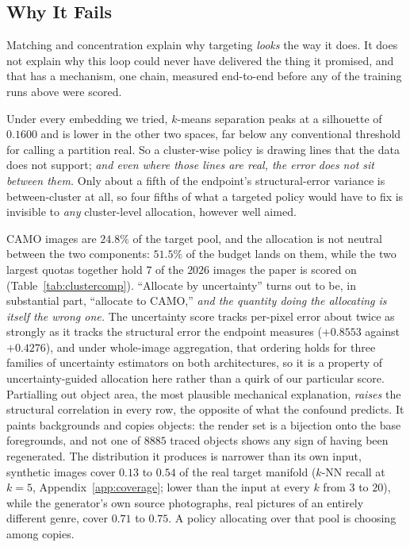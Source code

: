 \documentclass{article}
\newif\ifrevmarked \revmarkedtrue
\DeclareRobustCommand{\revB}[1]{\ifrevmarked{\color{RevB}#1}\else{#1}\fi}
\begin{document}
\subsection{Why It Fails}
\label{sec:why}
\revB{Matching and concentration explain} why targeting \emph{looks} the way it does. It does not explain why this loop
could never have delivered the thing it promised, and that has a mechanism, one chain, measured end-to-end before any of the training runs above were scored.

Under every embedding we tried, $k$-means separation peaks at a
silhouette of $0.1600$ and is lower in the other two spaces, far below any conventional threshold
for calling a partition real. So a cluster-wise policy is drawing lines that the data does not
support; \textit{and even where those lines are real, the error does not sit between them.} Only
about a fifth of the endpoint's structural-error variance is between-cluster at all, so four fifths
of what a targeted policy would have to fix is invisible to \emph{any} cluster-level allocation,
however well aimed.

CAMO images are $24.8\%$ of the target pool, and the allocation is not neutral between the two components: $51.5\%$
of the budget lands on them, while the two largest quotas together hold $7$ of the $2026$ images the
paper is scored on (Table~\ref{tab:clustercomp}). ``Allocate by uncertainty'' turns out to be, in substantial part, ``allocate
to CAMO,'' \textit{and the quantity doing the allocating is itself the wrong one.} The
uncertainty score tracks per-pixel error about twice as strongly as it tracks the structural error
the endpoint measures ($+0.8553$ against $+0.4276$), and under whole-image aggregation, that ordering
holds for three families of uncertainty estimators on both architectures, so it is a property of uncertainty-guided allocation
here rather than a quirk of our particular score. Partialling out object area, the most plausible
mechanical explanation, \emph{raises} the structural correlation in every row, the opposite of what the confound predicts. It paints backgrounds and copies objects: the render set is a bijection onto the base foregrounds, and not one
of $8885$ traced objects shows any sign of having been regenerated. The distribution it produces is
narrower than its own input, synthetic images cover $0.13$ to $0.54$ of the real target manifold
($k$-NN recall \revB{at $k = 5$}, Appendix~\ref{app:coverage}\revB{; lower than the input at every $k$ from $3$ to $20$}), while the generator's own source photographs, real
pictures of an entirely different genre, cover $0.71$ to $0.75$. A policy allocating over that pool is choosing among copies.
\end{document}
